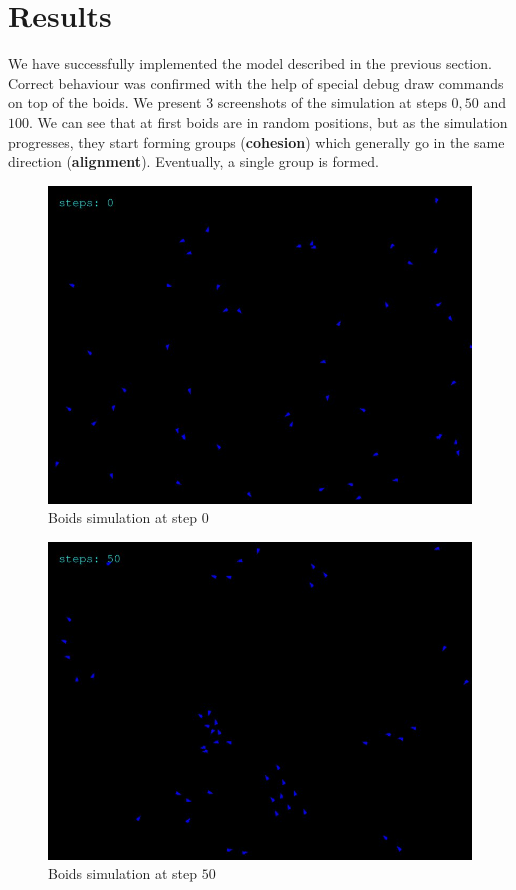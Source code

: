 \documentclass[9pt]{pnas-new}
\begin{document}
\section*{Results}
We have successfully implemented the model described in the previous section.
Correct behaviour was confirmed with the help of special debug draw commands on top of the boids.
We present 3 screenshots of the simulation at steps $0, 50$ and $100$.
We can see that at first boids are in random positions, but as the simulation progresses, they start forming groups (\textbf{cohesion}) which generally go in the same direction (\textbf{alignment}).
Eventually, a single group is formed.

\begin{figure}[h]
	\centering
	\includegraphics[width=0.8\linewidth]{boids_step_0.jpg}
	\caption{Boids simulation at step $0$}
\end{figure}
\begin{figure}[h]
	\centering
	\includegraphics[width=0.8\linewidth]{boids_step_50.jpg}
	\caption{Boids simulation at step $50$}
\end{figure}
\end{document}
